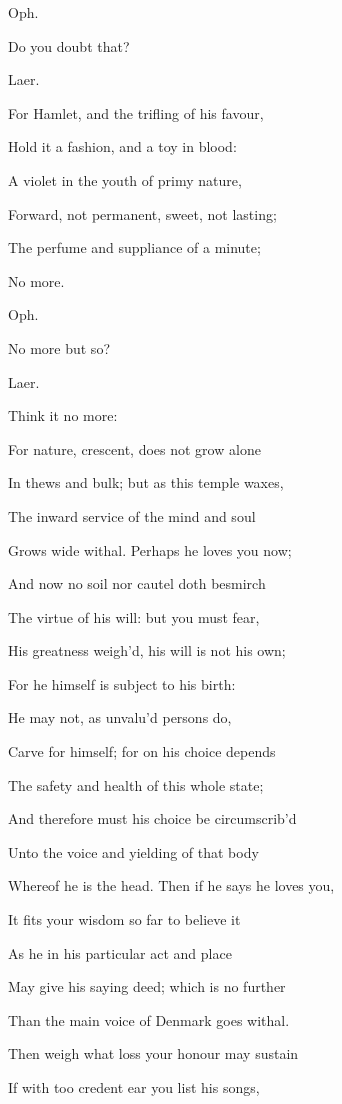 \documentclass[12pt]{book}
\begin{document}
Oph.

Do you doubt that?



Laer.

For Hamlet, and the trifling of his favour,

Hold it a fashion, and a toy in blood:

A violet in the youth of primy nature,

Forward, not permanent, sweet, not lasting;

The perfume and suppliance of a minute;

No more.



Oph.

No more but so?



Laer.

Think it no more:

For nature, crescent, does not grow alone

In thews and bulk; but as this temple waxes,

The inward service of the mind and soul

Grows wide withal. Perhaps he loves you now;

And now no soil nor cautel doth besmirch

The virtue of his will: but you must fear,

His greatness weigh'd, his will is not his own;

For he himself is subject to his birth:

He may not, as unvalu'd persons do,

Carve for himself; for on his choice depends

The safety and health of this whole state;

And therefore must his choice be circumscrib'd

Unto the voice and yielding of that body

Whereof he is the head. Then if he says he loves you,

It fits your wisdom so far to believe it

As he in his particular act and place

May give his saying deed; which is no further

Than the main voice of Denmark goes withal.

Then weigh what loss your honour may sustain

If with too credent ear you list his songs,
\end{document}
